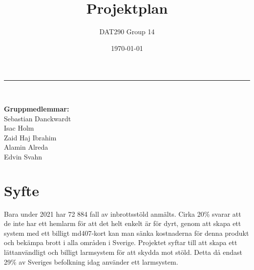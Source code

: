 \documentclass[a4paper]{article}
\title{Projektplan}
\author{DAT290 Group 14}
\date{\today}
\begin{document}
\maketitle
\hrule
\ \\[0.2cm]
\begin{center}
\begin{minipage}{0.5\textwidth}
		\textbf{Gruppmedlemmar:} \\
		Sebastian Danckwardt \\
		Isac Holm \\
		Zaid Haj Ibrahim \\
		Alamin Alreda \\
		Edvin Svahn
\end{minipage}
\end{center}
\clearpage

\tableofcontents
\newpage

\section{Syfte}
Bara under 2021 har 72 884 fall av inbrottsstöld anmälts\cite{BRa}. Cirka 20\% svarar att de inte har ett hemlarm för att det helt enkelt är för dyrt\cite{MoFor}, genom att skapa ett system med ett billigt md407-kort kan man sänka kostnaderna för denna produkt och bekämpa brott i alla områden i Sverige. Projektet syftar till att skapa ett lättanvändligt och billigt larmsystem för att skydda mot stöld. Detta då endast 29\% av Sveriges befolkning idag använder ett larmsystem\cite{SSF}.  




\end{document}
